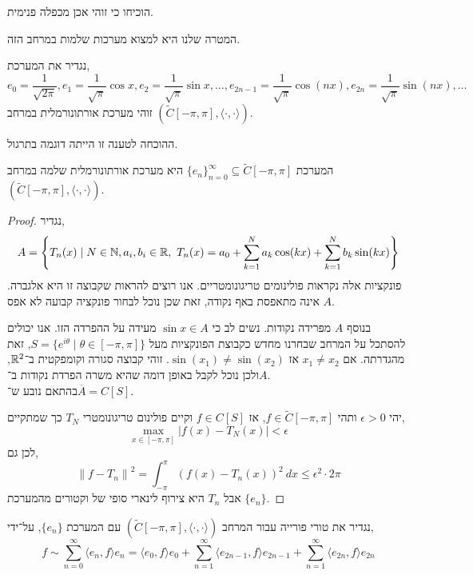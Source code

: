 \begin{exercise}
	הוכיחו כי זוהי אכן מכפלה פנימית.
\end{exercise}
המטרה שלנו היא למצוא מערכות שלמות במרחב הזה.
\begin{definition}
	נגדיר את המערכת,
	\[
		e_0 = \frac{1}{\sqrt{2 \pi}},
		e_1 = \frac{1}{\sqrt{\pi}} \cos x,
		e_2 = \frac{1}{\sqrt{\pi}} \sin x,
		\ldots,
		e_{2n - 1} = \frac{1}{\sqrt{\pi}} \cos(nx),
		e_{2n} = \frac{1}{\sqrt{\pi}} \sin(nx),
		\ldots
	\]
	זוהי מערכת אורתונורמלית במרחב $(\tilde{C}[-\pi, \pi], \langle \cdot, \cdot \rangle)$.
\end{definition}
\begin{remark}
	ההוכחה לטענה זו הייתה דוגמה בתרגול.
\end{remark}
\begin{theorem}
	המערכת ${\{ e_n \}}_{n = 0}^\infty \subseteq \tilde{C}[-\pi, \pi]$ היא מערכת אורתונורמלית שלמה במרחב $(\tilde{C}[-\pi, \pi], \langle \cdot, \cdot \rangle)$.
\end{theorem}
\begin{proof}
	נגדיר,
	\[
		A
		= \left\{ T_n(x) \mid N \in \mathbb{N}, a_i, b_i \in \mathbb{R},\ T_n(x) = a_0 + \sum_{k = 1}^N a_k \cos(kx) + \sum_{k = 1}^N b_k \sin(kx) \right\}
	\]
	פונקציות אלה נקראות פולינומים טריגונומטריים.
	אנו רוצים להראות שקבוצה זו היא אלגברה.
	$A$ אינה מתאפסת באף נקודה, זאת שכן נוכל לבחור פונקציה קבועה לא אפס.

	בנוסף $A$ מפרידה נקודות.
	נשים לב כי $\sin x \in A$ מעידה על ההפרדה הזו.
	אנו יכולים להסתכל על המרחב שבחרנו מחדש כקבוצת הפונקציות מעל $S = \{ e^{i \theta} \mid \theta \in [-\pi, \pi] \}$, זאת מהגדרתה.
	אם $x_1 \ne x_2$ אז $\sin(x_1) \ne \sin(x_2)$.
	זוהי קבוצה סגורה וקומפקטית ב־$\mathbb{R}^2$, ולכן נוכל לקבל באופן דומה שהיא משרה הפרדת נקודות ב־$A$. \\
	בהתאם נובע ש־$\overline{A} = C[S]$.

	יהי $\epsilon > 0$ ותהי $f \in \tilde{C}[-\pi, \pi]$, אז $f \in C[S]$ וקיים פולינום טריגונומטרי $T_N$ כך שמתקיים,
	\[
		\max_{x \in [-\pi, \pi]} |f(x) - T_N(x)| < \epsilon
	\]
	לכן גם,
	\[
		{\lVert f - T_n \rVert}^2
		= \int_{-\pi}^{\pi} {(f(x) - T_n(x))}^2\ dx
		\le \epsilon^2 \cdot 2 \pi
	\]
	אבל $T_n$ היא צירוף לינארי סופי של וקטורים מהמערכת $\{ e_n \}$.
\end{proof}
\begin{definition}
	נגדיר את טורי פורייה עבור המרחב $(\tilde{C}[-\pi, \pi], \langle \cdot, \cdot \rangle)$ עם המערכת ${\{ e_n \}}$, על־ידי,
	\[
		f
		\sim \sum_{n = 0}^\infty \langle e_n, f \rangle e_n
		= \langle e_0, f \rangle e_0 + \sum_{n = 1}^\infty \langle e_{2n - 1}, f \rangle e_{2n - 1} + \sum_{n = 1}^\infty \langle e_{2n}, f \rangle e_{2n}
	\]
\end{definition}
